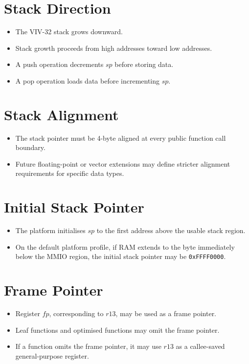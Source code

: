\section{Stack Direction}

\begin{itemize}
  \item The VIV-32 stack grows downward.
  \item Stack growth proceeds from high addresses toward low addresses.
  \item A push operation decrements \(sp\) before storing data.
  \item A pop operation loads data before incrementing \(sp\).
\end{itemize}

\section{Stack Alignment}

\begin{itemize}
  \item The stack pointer must be 4-byte aligned at every public function call boundary.
  \item Future floating-point or vector extensions may define stricter alignment requirements for specific data types.
\end{itemize}

\section{Initial Stack Pointer}

\begin{itemize}
  \item The platform initialises \(sp\) to the first address above the usable stack region.
  \item On the default platform profile, if RAM extends to the byte immediately below the MMIO region, the initial stack pointer may be \texttt{0xFFFF0000}.
\end{itemize}

\section{Frame Pointer}

\begin{itemize}
  \item Register \(fp\), corresponding to \(r13\), may be used as a frame pointer.
  \item Leaf functions and optimised functions may omit the frame pointer.
  \item If a function omits the frame pointer, it may use \(r13\) as a callee-saved general-purpose register.
\end{itemize}

